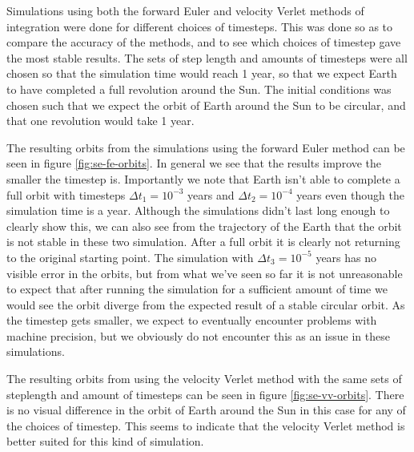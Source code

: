 \documentclass[reprint,english,notitlepage]{revtex4-1}  %
\begin{document}
Simulations using both the forward Euler and velocity Verlet methods of integration were done for different choices of timesteps. This was done so as to compare the accuracy of the methods, and to see which choices of timestep gave the most stable results. The sets of step length and amounts of timesteps were all chosen so that the simulation time would reach 1 year, so that we expect Earth to have completed a full revolution around the Sun. The initial conditions was chosen such that we expect the orbit of Earth around the Sun to be circular, and that one revolution would take 1 year. 

The resulting orbits from the simulations using the forward Euler method can be seen in figure \ref{fig:se-fe-orbits}. In general we see that the results improve the smaller the timestep is. Importantly we note that Earth isn't able to complete a full orbit with timesteps $\Delta t_1 = 10^{-3}$ years and $\Delta t_2 = 10^{-4}$ years even though the simulation time is a year. Although the simulations didn't last long enough to clearly show this, we can also see from the trajectory of the Earth that the orbit is not stable in these two simulation. After a full orbit it is clearly not returning to the original starting point. The simulation with $\Delta t_3 = 10^{-5}$ years has no visible error in the orbits, but from what we've seen so far it is not unreasonable to expect that after running the simulation for a sufficient amount of time we would see the orbit diverge from the expected result of a stable circular orbit. As the timestep gets smaller, we expect to eventually encounter problems with machine precision, but we obviously do not encounter this as an issue in these simulations. 

The resulting orbits from using the velocity Verlet method with the same sets of steplength and amount of timesteps can be seen in figure \ref{fig:se-vv-orbits}. There is no visual difference in the orbit of Earth around the Sun in this case for any of the choices of timestep. This seems to indicate that the velocity Verlet method is better suited for this kind of simulation. 
\end{document}
